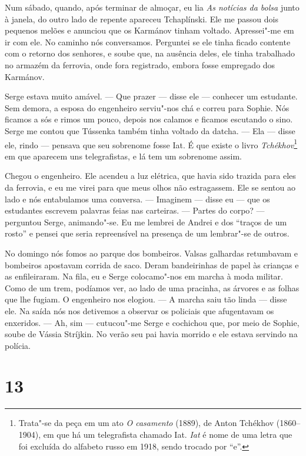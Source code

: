 Num sábado, quando, após terminar de almoçar, eu lia \emph{As notícias
da bolsa} junto à janela, do outro lado de repente apareceu Tchaplínski.
Ele me passou dois pequenos melões e anunciou que os Karmánov tinham
voltado. Apressei"-me em ir com ele. No caminho nós conversamos.
Perguntei se ele tinha ficado contente com o retorno dos senhores, e
soube que, na ausência deles, ele tinha trabalhado no armazém da
ferrovia, onde fora registrado, embora fosse empregado dos Karmánov.

Serge estava muito amável. --- Que prazer --- disse ele --- conhecer um
estudante. Sem demora, a esposa do engenheiro serviu"-nos chá e correu
para Sophie. Nós ficamos a sós e rimos um pouco, depois nos calamos e
ficamos escutando o sino. Serge me contou que Tússenka também tinha
voltado da datcha. --- Ela --- disse ele, rindo --- pensava que seu
sobrenome fosse Iat. É que existe o livro \emph{Tchékhov}\footnote{Trata"-se
  da peça em um ato \emph{O casamento} (1889), de Anton Tchékhov
  (1860--1904), em que há um telegrafista chamado Iat. \emph{Iat} é nome
  de uma letra que foi excluída do alfabeto russo em 1918, sendo trocado
  por ``e''.} em que aparecem uns telegrafistas, e lá tem um sobrenome
assim.

Chegou o engenheiro. Ele acendeu a luz elétrica, que havia sido trazida
para eles da ferrovia, e eu me virei para que meus olhos não
estragassem. Ele se sentou ao lado e nós entabulamos uma conversa. ---
Imaginem --- disse eu --- que os estudantes escrevem palavras feias nas
carteiras. --- Partes do corpo? --- perguntou Serge, animando"-se. Eu me
lembrei de Andrei e dos ``traços de um rosto'' e pensei que seria
repreensível na presença de um lembrar"-se de outros.

No domingo nós fomos ao parque dos bombeiros. Valsas galhardas
retumbavam e bombeiros apostavam corrida de saco. Deram bandeirinhas de
papel às crianças e as enfileiraram. Na fila, eu e Serge colocamo"-nos em
marcha à moda militar. Como de um trem, podíamos ver, ao lado de uma
pracinha, as árvores e as folhas que lhe fugiam. O engenheiro nos
elogiou. --- A marcha saiu tão linda --- disse ele. Na saída nós nos
detivemos a observar os policiais que afugentavam os enxeridos. --- Ah,
sim --- cutucou"-me Serge e cochichou que, por meio de Sophie, soube de
Vássia Stríjkin. No verão seu pai havia morrido e ele estava servindo na
polícia.

\section{13}

